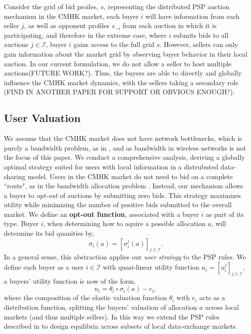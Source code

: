 \documentclass[12pt]{article}
\theoremstyle{definition}
\newcommand{\mcI}{\mathcal{I}}
\newcommand{\g}{\sigma}
\begin{document}
\begin{multicols}{2}
Consider the grid of bid proiles, $s$, representing the distributed PSP auction
mechanism in the CMHK market, each buyer $i$ will
have information from each seller $j$, as well as opponent profiles $s_{-i}$
from each auction in which it is participating, and therefore
in the extreme case, where $i$ submits bids to all auctions $j\in\mcI$, buyer
$i$ gains access to the full grid $s$. However, 
sellers can only gain information about the market grid by observing buyer
behavior in their local auction.
In our current formulation, we do not allow a seller to host multiple
auctions(FUTURE WORK?). Thus, the buyers are able to directly and globally
influence the CMHK market dynamics, with the sellers taking a secondary role
(FIND IN ANOTHER PAPER FOR SUPPORT OR OBVIOUS ENOUGH?).



\subsection{User Valuation}

We assume that the CMHK market does not have network
bottlenecks, which is purely a bandwidth problem, as in \cite{semret}, and as
bandwidth in wireless networks is not the focus of this paper. We
conduct a comprehensive analysis, deriving a globally optimal strategy suited for
users with local information in a distrubuted data-sharing model. 
Users in the CMHK market do not need to bid on a complete ``route", as in the
bandwidth allocation problem \cite{semret}. Instead, our mechanism allows a buyer
to \emph{opt-out} of auctions by submitting zero bids. This strategy maximizes
utility while minimizing the number of positive bids submitted to the overall
market. We define an \textbf{opt-out function}, associated with a buyer $i$ as
part of its type. Buyer $i$, when determining how to aquire a possible allocation $a$,
will determine its bid quanities by,
\begin{equation}\label{opt-out}
    \g_i(a) = [\g_i^j(a)]_{j\in\mcI}.
\end{equation}
In a general sense, this abstraction applies our \emph{user strategy}
to the PSP rules.
We define each buyer as a user $i\in\mcI$ with quasi-linear utility
function $u_i = [u_i^j]_{j\in\mcI}$, a buyers' utility function is now of the form,
\begin{equation}\label{buyerutility}
    u_i = \theta_i \circ \g_i(a) - c_i,
\end{equation}
where the composition of the elastic valuation function $\theta_i$ with $e_i$ acts as a distribution function, splitting
the buyers' valuation of allocation $a$ across local markets (and thus multiple sellers).
In this way we extend the PSP rules described
in \cite{semret} to design equilibria across subsets of local data-exchange markets.


\end{multicols}
\end{document}
